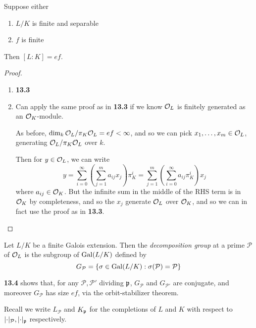 \documentclass[10pt,a4paper]{article}
\begin{document}
\begin{corollary}
  Suppose either
  \begin{enumerate}
    \item $L/K$ is finite and separable
    \item $f$ is finite
  \end{enumerate}
  Then $[L:K] = ef$.
\end{corollary}
\begin{proof}\hspace*{0cm}
  \begin{enumerate}
    \item \textbf{13.3}
    \item Can apply the same proof as in \textbf{13.3} if we know $\mathcal{O}_L$ is finitely generated as an $\mathcal{O}_K$-module.

    As before, $\dim_k \mathcal{O}_L/\pi_K\mathcal{O}_L = ef < \infty$, and so we can pick $x_1, \ldots, x_m \in \mathcal{O}_L$, generating $\mathcal{O}_L/\pi_K \mathcal{O}_L$ over $k$.

    Then for $y \in \mathcal{O}_L$, we can write
    \[y = \sum_{i=0}^\infty \left(\sum_{j=1}^m a_{ij}x_j\right)\pi_K^i = \sum_{j=1}^m \left(\sum_{i=0}^\infty a_{ij}\pi_K^i\right)x_j\]
    where $a_{ij} \in \mathcal{O}_K$. But the infinite sum in the middle of the RHS term is in $\mathcal{O}_K$ by completeness, and so the $x_j$ generate $\mathcal{O}_L$ over $\mathcal{O}_K$, and so we can in fact use the proof as in \textbf{13.3}.
  \end{enumerate}
\end{proof}
\begin{definition}
  Let $L/K$ be a finite Galois extension. Then the \emph{decomposition group} at a prime $\mathcal{P}$ of $\mathcal{O}_L$ is the subgroup of $\operatorname{Gal}(L/K)$ defined by
  \[G_\mathcal{P} = \{\sigma \in \operatorname{Gal}(L/K) : \sigma(\mathcal{P}) = \mathcal{P}\}\]
\end{definition}
\textbf{13.4} shows that, for any $\mathcal{P}, \mathcal{P}'$ dividing $\mathfrak{p}$, $G_\mathcal{P}$ and $G_{\mathcal{P}'}$ are conjugate, and moreover $G_\mathcal{P}$ has size $ef$, via the orbit-stabilizer theorem.

Recall we write $L_{\mathcal{P}}$ and $K_{\mathfrak{p}}$ for the completions of $L$ and $K$ with respect to $\lvert\cdot\rvert_\mathcal{P}, \lvert\cdot\rvert_{\mathfrak{p}}$ respectively.
\end{document}
